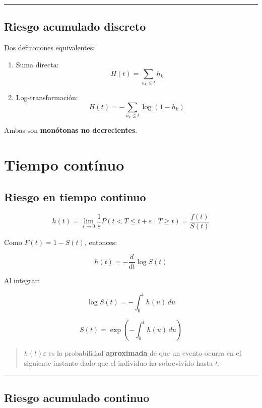 \documentclass[
  letterpaper,
  DIV=11,
  numbers=noendperiod]{scrartcl}
\begin{document}
\begin{center}\rule{0.5\linewidth}{0.5pt}\end{center}

\subsection{Riesgo acumulado discreto}\label{riesgo-acumulado-discreto}

Dos definiciones equivalentes:

\begin{enumerate}
\def\labelenumi{\arabic{enumi}.}
\item
  Suma directa: \[
  H(t) = \sum_{u_k \le t} h_k
  \]
\item
  Log-transformación: \[
  H(t) = - \sum_{u_k \le t} \log(1 - h_k)
  \]
\end{enumerate}

Ambas son \textbf{monótonas no decrecientes}.

\section{Tiempo contínuo}\label{tiempo-contuxednuo}

\subsection{Riesgo en tiempo continuo}\label{riesgo-en-tiempo-continuo}

\[
h(t) = \lim_{\varepsilon \to 0} \frac{1}{\varepsilon} P(t < T \le t + \varepsilon \mid T \ge t)
= \frac{f(t)}{S(t)}
\]

Como \(F(t) = 1 - S(t)\), entonces:

\[
h(t) = -\frac{d}{dt} \log S(t)
\]

Al integrar:

\[
\log S(t) = -\int_0^t h(u) \, du
\]

\[
S(t) = \exp\left(-\int_0^t h(u) \, du\right)
\]

\begin{quote}
\(h(t)\varepsilon\) es la probabilidad \textbf{aproximada} de que un
evento ocurra en el siguiente instante dado que el individuo ha
sobrevivido hasta \(t\).
\end{quote}

\begin{center}\rule{0.5\linewidth}{0.5pt}\end{center}

\subsection{Riesgo acumulado continuo}\label{riesgo-acumulado-continuo}
\end{document}

